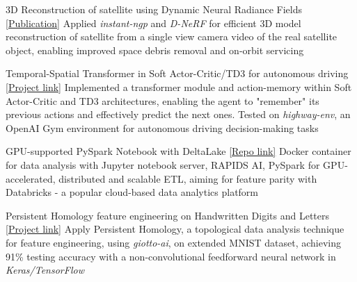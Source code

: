 \vspace{-5mm}
\vspace{-2mm}

\begin{cventries}

	\cventry
	{}
	{3D Reconstruction of satellite using Dynamic Neural Radiance Fields}
	{\href{https://arxiv.org/abs/2301.09060}{[Publication]}}
	{}
	{Applied \emph{instant-ngp} and \emph{D-NeRF} for efficient 3D model reconstruction of satellite from a single view camera video of the real satellite object, enabling improved space debris removal and on-orbit servicing}

	\cventry
	{}
	{Temporal-Spatial Transformer in Soft Actor-Critic/TD3 for autonomous driving}
	{\href{https://github.com/sesem738/Lavenza}{[Project link]}}
	{}
	{Implemented a transformer module and action-memory within Soft Actor-Critic and TD3 architectures, enabling the agent to "remember" its previous actions and effectively predict the next ones. Tested on \emph{highway-env}, an OpenAI Gym environment for autonomous driving decision-making tasks}

	\cventry
	{}
	{GPU-supported PySpark Notebook with DeltaLake}
	{\href{https://github.com/n0k0m3/pyspark-notebook-deltalake-docker}{[Repo link]}}
	{}
	{Docker container for data analysis with Jupyter notebook server, RAPIDS AI, PySpark for GPU-accelerated, distributed and scalable ETL, aiming for feature parity with Databricks - a popular cloud-based data analytics platform}

	\cventry
	{}
	{Persistent Homology feature engineering on Handwritten Digits and Letters}
	{\href{https://colab.research.google.com/drive/18z161k3diYO6sNVBfiKH8uGqbrekxMPN?usp=sharing}{[Project link]}}
	{}
	{Apply Persistent Homology, a topological data analysis technique for feature engineering, using \emph{giotto-ai}, on extended MNIST dataset, achieving 91\% testing accuracy with a non-convolutional feedforward neural network in \emph{Keras/TensorFlow}}




\end{cventries}
